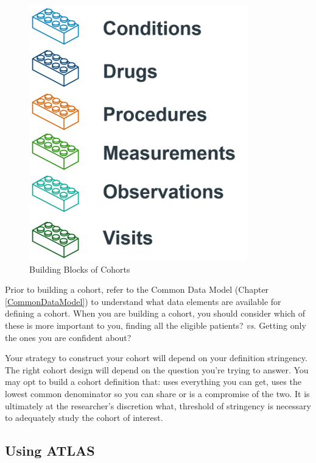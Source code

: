 \documentclass[11pt]{book}
\theoremstyle{definition}
\theoremstyle{definition}
\theoremstyle{definition}
\theoremstyle{remark}
\begin{document}
\begin{figure}
\includegraphics[width=1\linewidth]{images/Cohorts/cohort-legos} \caption{Building Blocks of Cohorts}\label{fig:cohortLegos}
\end{figure}

Prior to building a cohort, refer to the Common Data Model (Chapter \ref{CommonDataModel}) to understand what data elements are available for defining a cohort. When you are building a cohort, you should consider which of these is more important to you, finding all the eligible patients? \emph{vs.} Getting only the ones you are confident about?

Your strategy to construct your cohort will depend on your definition stringency. The right cohort design will depend on the question you're trying to answer. You may opt to build a cohort definition that: uses everything you can get, uses the lowest common denominator so you can share or is a compromise of the two. It is ultimately at the researcher's discretion what, threshold of stringency is necessary to adequately study the cohort of interest.

\hypertarget{using-atlas}{%
\subsection{Using ATLAS}\label{using-atlas}}
\end{document}
